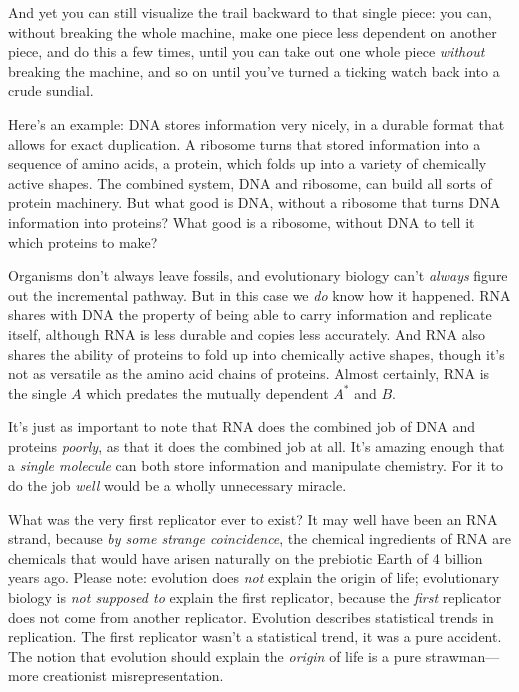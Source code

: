  And yet you can still visualize the trail backward to that single
piece: you can, without breaking the whole machine, make one piece less
dependent on another piece, and do this a few times, until you can take
out one whole piece \textit{without} breaking the machine, and so on
until you've turned a ticking watch back into a crude
sundial.


 Here's an example: DNA stores information very
nicely, in a durable format that allows for exact duplication. A
ribosome turns that stored information into a sequence of amino acids,
a protein, which folds up into a variety of chemically active shapes.
The combined system, DNA and ribosome, can build all sorts of protein
machinery. But what good is DNA, without a ribosome that turns DNA
information into proteins? What good is a ribosome, without DNA to tell
it which proteins to make?


 Organisms don't always leave fossils, and
evolutionary biology can't \textit{always} figure out
the incremental pathway. But in this case we \textit{do} know how it
happened. RNA shares with DNA the property of being able to carry
information and replicate itself, although RNA is less durable and
copies less accurately. And RNA also shares the ability of proteins to
fold up into chemically active shapes, though it's not
as versatile as the amino acid chains of proteins. Almost certainly,
RNA is the single $A$ which predates the mutually dependent
$A^{*}$ and $B$.


 It's just as important to note that RNA does the
combined job of DNA and proteins \textit{poorly}, as that it does the
combined job at all. It's amazing enough that a
\textit{single molecule} can both store information and manipulate
chemistry. For it to do the job \textit{well} would be a wholly
unnecessary miracle.


 What was the very first replicator ever to exist? It may well have
been an RNA strand, because \textit{by some strange coincidence}, the
chemical ingredients of RNA are chemicals that would have arisen
naturally on the prebiotic Earth of 4 billion years ago. Please note:
evolution does \textit{not} explain the origin of life; evolutionary
biology is \textit{not supposed to} explain the first replicator,
because the \textit{first} replicator does not come from another
replicator. Evolution describes statistical trends in replication. The
first replicator wasn't a statistical trend, it was a
pure accident. The notion that evolution should explain the
\textit{origin} of life is a pure strawman---more creationist
misrepresentation.


